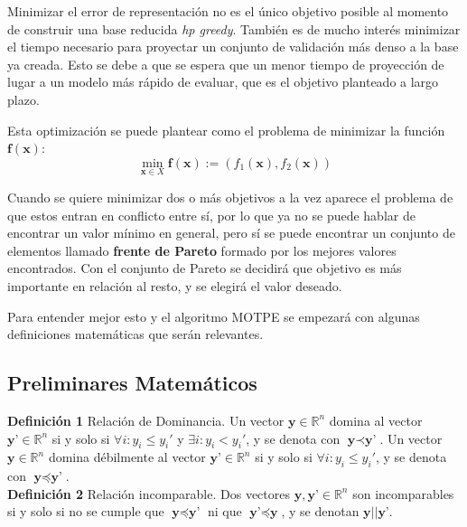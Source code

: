 Minimizar el error de representación no es el único objetivo posible al momento de construir una base reducida \textit{hp greedy}. También es de mucho interés minimizar el tiempo necesario para proyectar un conjunto de validación más denso a la base ya creada. Esto se debe a que se espera que un menor tiempo de proyección de lugar a un modelo más rápido de evaluar, que es el objetivo planteado a largo plazo.


Esta optimización se puede plantear como el problema de minimizar la función $\textbf{f}(\textbf{x})$:
\[
 \min_{\textbf{x} \in X} \textbf{f}(\textbf{x}) := (f_1(\textbf{x}), f_2(\textbf{x}))
\]

Cuando se quiere minimizar dos o más objetivos a la vez aparece el problema de que estos entran en conflicto entre sí, por lo que ya no se puede hablar de encontrar un valor mínimo en general, pero sí se puede encontrar un conjunto de elementos llamado \textbf{frente de Pareto} formado por los mejores valores encontrados. Con el conjunto de Pareto se decidirá que objetivo es más importante en relación al resto, y se elegirá el valor deseado.

Para entender mejor esto y el algoritmo MOTPE se empezará con algunas definiciones matemáticas que serán relevantes.

\subsection{Preliminares Matemáticos}

\noindent\textbf{Definición 1} Relación de Dominancia. Un vector $\textbf{y} \in \mathbb{R}^n$ domina al vector $\textbf{y'} \in \mathbb{R}^n$ si y solo si $\forall i: y_i \leq y_i'$ y $\exists i : y_i < y_i'$, y se denota con $\textbf{y} \prec \textbf{y'} $. Un vector $\textbf{y} \in \mathbb{R}^n$ domina débilmente al vector $\textbf{y'} \in \mathbb{R}^n$ si y solo si $\forall i: y_i \leq y_i'$, y se denota con $\textbf{y} \preceq \textbf{y'} $. \\


\noindent\textbf{Definición 2} Relación incomparable. Dos vectores $\textbf{y},\textbf{y'} \in \mathbb{R}^n$ son incomparables si y solo si no se cumple que $\textbf{y} \preceq \textbf{y'} $ ni que $\textbf{y'} \preceq \textbf{y} $, y se denotan $\textbf{y}||\textbf{y'}$.\\



